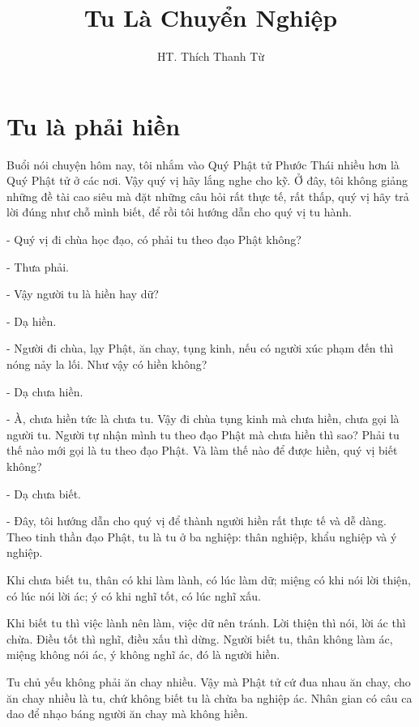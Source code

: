 \documentclass[
  12pt,
  oneside]{book}
\title{Tu Là Chuyển Nghiệp}
\author{HT. Thích Thanh Từ}
\date{}
\begin{document}
\maketitle

{
\setcounter{tocdepth}{1}
\tableofcontents
}
\hypertarget{tu-la-phai-hien}{%
\chapter*{Tu là phải hiền}\label{tu-la-phai-hien}}

Buổi nói chuyện hôm nay, tôi nhắm vào Quý Phật tử Phước Thái nhiều hơn là Quý Phật tử ở các nơi. Vậy quý vị hãy lắng nghe cho kỹ. Ở đây, tôi không giảng những đề tài cao siêu mà đặt những câu hỏi rất thực tế, rất thấp, quý vị hãy trả lời đúng như chỗ mình biết, để rồi tôi hướng dẫn cho quý vị tu hành.

- Quý vị đi chùa học đạo, có phải tu theo đạo Phật không?

- Thưa phải.

- Vậy người tu là hiền hay dữ?

- Dạ hiền.

- Người đi chùa, lạy Phật, ăn chay, tụng kinh, nếu có người xúc phạm đến thì nóng nảy la lối. Như vậy có hiền không?

- Dạ chưa hiền.

- À, chưa hiền tức là chưa tu. Vậy đi chùa tụng kinh mà chưa hiền, chưa gọi là người tu. Người tự nhận mình tu theo đạo Phật mà chưa hiền thì sao? Phải tu thế nào mới gọi là tu theo đạo Phật. Và làm thế nào để được hiền, quý vị biết không?

- Dạ chưa biết.

- Đây, tôi hướng dẫn cho quý vị để thành người hiền rất thực tế và dễ dàng. Theo tinh thần đạo Phật, tu là tu ở ba nghiệp: thân nghiệp, khẩu nghiệp và ý nghiệp.

Khi chưa biết tu, thân có khi làm lành, có lúc làm dữ; miệng có khi nói lời thiện, có lúc nói lời ác; ý có khi nghĩ tốt, có lúc nghĩ xấu.

Khi biết tu thì việc lành nên làm, việc dữ nên tránh. Lời thiện thì nói, lời ác thì chừa. Điều tốt thì nghĩ, điều xấu thì dừng. Người biết tu, thân không làm ác, miệng không nói ác, ý không nghĩ ác, đó là người hiền.

Tu chủ yếu không phải ăn chay nhiều. Vậy mà Phật tử cứ đua nhau ăn chay, cho ăn chay nhiều là tu, chứ không biết tu là chừa ba nghiệp ác. Nhân gian có câu ca dao để nhạo báng người ăn chay mà không hiền.
\end{document}
